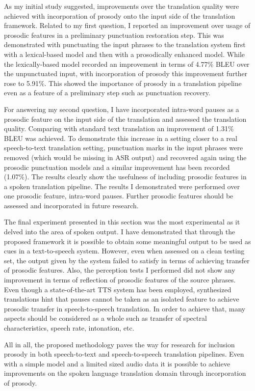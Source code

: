 As my initial study suggested, improvements over the translation quality were achieved with incorporation of prosody onto the input side of the translation framework. Related to my first question, I reported an improvement over usage of prosodic features in a preliminary punctuation restoration step. This was demonstrated with punctuating the input phrases to the translation system first with a lexical-based model and then with a prosodically enhanced model. While the lexically-based model recorded an improvement in terms of 4.77\% BLEU over the unpunctuated input, with incorporation of prosody this improvement further rose to 5.91\%. This showed the importance of prosody in a translation pipeline even as a feature of a preliminary step such as punctuation recovery. 

For answering my second question, I have incorporated intra-word pauses as a prosodic feature on the input side of the translation and assessed the translation quality. Comparing with standard text translation an improvement of 1.31\% BLEU was achieved. To demonstrate this increase in a setting closer to a real speech-to-text translation setting, punctuation marks in the input phrases were removed (which would be missing in ASR output) and recovered again using the prosodic punctuation models and a similar improvement has been recorded (1.07\%). The results clearly show the usefulness of including prosodic features in a spoken translation pipeline. The results I demonstrated were performed over one prosodic feature, intra-word pauses. Further prosodic features should be assessed and incorporated in future research. 

The final experiment presented in this section was the most experimental as it delved into the area of spoken output. I have demonstrated that through the proposed framework it is possible to obtain some meaningful output to be used as cues in a text-to-speech system. However, even when assessed on a clean testing set, the output given by the system failed to satisfy in terms of achieving transfer of prosodic features. Also, the perception tests I performed did not show any improvement in terms of reflection of prosodic features of the source phrases. Even though a state-of-the-art TTS system has been employed, synthesized translations hint that pauses cannot be taken as an isolated feature to achieve prosodic transfer in speech-to-speech translation. In order to achieve that, many aspects should be considered as a whole such as transfer of spectral characteristics, speech rate, intonation, etc. 

All in all, the proposed methodology paves the way for research for inclusion prosody in both speech-to-text and speech-to-speech translation pipelines. Even with a simple model and a limited sized audio data it is possible to achieve improvements on the spoken language translation domain through incorporation of prosody. 